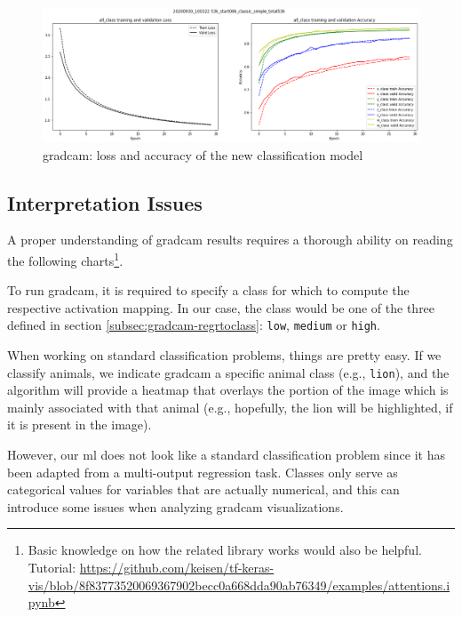 \begin{figure}[!h]
	\centering
	\includegraphics[width=1\textwidth]{"contents/images/04-metrics-class-simple"}
	\caption[\gls{gradcam}: loss and accuracy of the new classification model]{\gls{gradcam}: loss and accuracy of the new classification model}
	\label{fig:gradcam-retrain-simple}
\end{figure}



\subsection{Interpretation Issues}
\label{subsec:gradcam-reading}

A proper understanding of \gls{gradcam} results requires a thorough ability on reading the following charts\footnote{Basic knowledge on how the related library works would also be helpful. Tutorial: \url{https://github.com/keisen/tf-keras-vis/blob/8f83773520069367902becc0a668dda90ab76349/examples/attentions.ipynb}}.
 
\medskip

To run \gls{gradcam}, it is required to specify a class for which to compute the respective activation mapping. In our case, the class would be one of the three defined in section \ref{subsec:gradcam-regrtoclass}: \texttt{low}, \texttt{medium} or \texttt{high}. 

When working on standard classification problems, things are pretty easy. If we classify animals, we indicate \gls{gradcam} a specific animal class (e.g., \texttt{lion}), and the algorithm will provide a heatmap that overlays the portion of the image which is mainly associated with that animal (e.g., hopefully, the lion will be highlighted, if it is present in the image).

However, our \gls{ml} does not look like a standard classification problem since it has been adapted from a multi-output regression task. Classes only serve as categorical values for variables that are actually numerical, and this can introduce some issues when analyzing \gls{gradcam} visualizations.


